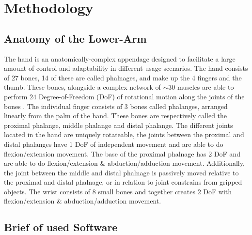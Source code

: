 \documentclass[../main.tex]{subfiles}
\begin{document}
\section{Methodology}

\subsection{Anatomy of the Lower-Arm}
\label{sec:anatomy}

The hand is an anatomically-complex appendage designed to facilitate a large amount of control and adaptability in different usage scenarios.
The hand consists of 27 bones, 14 of these are called phalnages, and make up the 4 fingers and the thumb.
These bones, alongside a complex network of $\sim30$ muscles are able to perform $24$ Degree-of-Freedom (DoF) of rotational motion along the joints of the bones \cite{anatomy}.
The individual finger consists of 3 bones called \gls{phalanges}, arranged linearly from the palm of the hand.
These bones are respectively called the proximal phalange, middle phalange and distal phalange.
The different joints located in the hand are uniquely rotateable,
the joints between the proximal and distal phalanges have 1 DoF of independent movement and are able to do \gls{flexion/extension} movement.
The base of the proximal phalnage has 2 DoF and are able to do \gls{flexion/extension} \& \gls{abduction/adduction} movement.
Additionally, the joint between the middle and distal phalnage is passively moved relative to the proximal and distal phalnage, or in relation to joint constrains from gripped objects.
The wrist consists of 8 small bones and together creates 2 DoF with \gls{flexion/extension} \& \gls{abduction/adduction} movement.



\subsection{Brief of used Software}
\label{sec:software}
\end{document}
